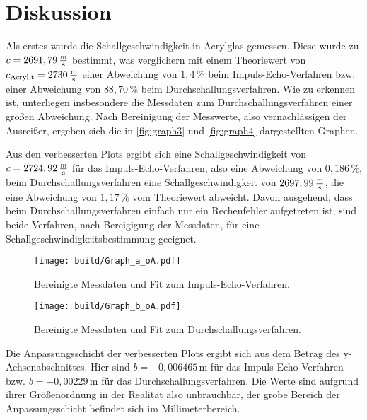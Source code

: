 \section{Diskussion}
\label{sec:Diskussion}
Als erstes wurde die Schallgeschwindigkeit in Acrylglas gemessen.%
Diese wurde zu $c = 2691,79 \,\unit{\frac{\meter}{\second}}$ bestimmt, was verglichern mit einem Theoriewert von
$c_{\text{Acryl},\text{t}} = 2730 \,\unit{\frac{\meter}{\second}} $ einer Abweichung von $1,4 \, \%$ beim Impuls-Echo-Verfahren 
bzw. einer Abweichung von $88,70 \, \%$ beim Durchschallungsverfahren. 
Wie zu erkennen ist, unterliegen insbesondere die Messdaten zum Durchschallungsverfahren einer großen Abweichung.
Nach Bereinigung der Messwerte, also vernachlässigen der Ausreißer, ergeben sich die in \autoref{fig:graph3} und \autoref{fig:graph4} %
dargestellten Graphen.

Aus den verbesserten Plots ergibt sich eine Schallgeschwindigkeit von $c = 2724,92 \,\unit{\frac{\meter}{\second}}$ für das
Impuls-Echo-Verfahren, also eine Abweichung von $0,186 \,\%$, beim Durchschallungsverfahren eine Schallgeschwindigkeit von
$2697,99 \,\unit{\frac{\meter}{\second}}$, die eine Abweichung von $1,17 \, \% $ vom Theoriewert abweicht. %
Davon ausgehend, dass beim Durchschallungsverfahren einfach nur ein Rechenfehler aufgetreten ist, sind beide Verfahren, nach
Bereigigung der Messdaten, für eine Schallgeschwindigkeitsbestimmung geeignet. \\

\begin{figure}[H]
    \centering
    \texttt{[image: build/Graph\_a\_oA.pdf]}
    \caption{Bereinigte Messdaten und Fit zum Impuls-Echo-Verfahren.}
    \label{fig:graph3}
\end{figure}

\begin{figure}[H]
    \centering
    \texttt{[image: build/Graph\_b\_oA.pdf]}
    \caption{Bereinigte Messdaten und Fit zum Durchschallungsverfahren.}
    \label{fig:graph4}
\end{figure}

Die Anpassungsschicht der verbesserten Plots ergibt sich aus dem Betrag des y-Achsenabschnittes.
Hier sind $b = -0,006465 \,\unit{\meter}$ für das Impuls-Echo-Verfahren bzw. $b = -0,00229 \,\unit{\meter}$ für das
Durchschallungsverfahren. 
Die Werte sind aufgrund ihrer Größenordnung in der Realität also unbrauchbar, der grobe Bereich der Anpassungsschicht befindet sich im Millimeterbereich.\\ 

